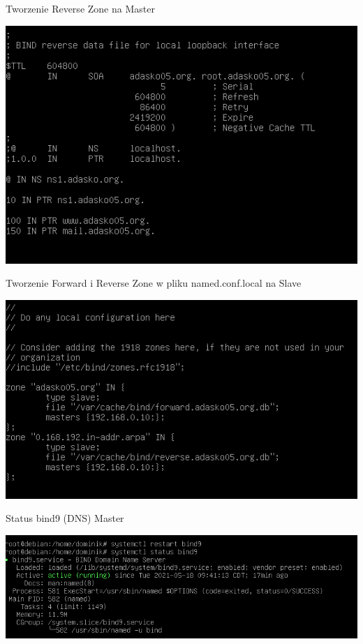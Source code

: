 \documentclass[presentation]{beamer}
\begin{document}
\begin{frame}[label={sec:org55d7923}]{Tworzenie Reverse Zone na Master}
\begin{center}
\includegraphics[width=.9\linewidth]{./data/dns/3.png}
\end{center}
\end{frame}
\begin{frame}[label={sec:org4d01ab4}]{Tworzenie Forward i Reverse Zone w pliku named.conf.local na Slave}
\begin{center}
\includegraphics[width=.9\linewidth]{./data/dns/4.png}
\end{center}
\end{frame}
\begin{frame}[label={sec:org9c1ac8b}]{Status bind9 (DNS) Master}
\begin{center}
\includegraphics[width=.9\linewidth]{./data/dns/5.png}
\end{center}
\end{frame}
\end{document}
